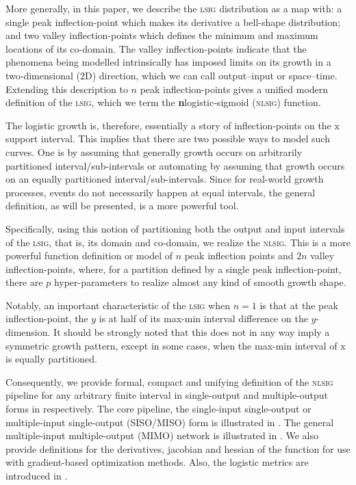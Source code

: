 \documentclass[journal]{IEEEtran}
\theoremstyle{plain}
\theoremstyle{definition}
\theoremstyle{remark}
\begin{document}
More generally, in this paper, we describe the \textsc{lsig} distribution as a map with: a single peak inflection-point which makes its derivative a bell-shape distribution; and two valley inflection-points which defines the minimum and maximum locations of its co-domain. The valley inflection-points indicate that the phenomena being modelled intrinsically has imposed limits
on its growth in a two-dimensional (2D) direction, which we can call output--input or space--time. Extending this description to $n$ peak inflection-points gives a unified modern definition of the \textsc{lsig}, which we term the \textbf{n}logistic-sigmoid (\textsc{nlsig}) function.

The logistic growth is, therefore, essentially a story of inflection-points on the $\mathrm{x}$ support interval. This implies that there are two possible ways to model such curves. One is by assuming that generally growth occurs on arbitrarily partitioned interval/sub-intervals or automating by assuming that growth occurs on an equally partitioned interval/sub-intervals. Since for real-world growth processes, events do not necessarily happen at equal intervals, the general definition, as will be presented, is a more powerful tool.

Specifically, using this notion of partitioning both the output and input intervals of the \textsc{lsig}, that is, its domain and co-domain, we realize the \textsc{nlsig}. This is a more powerful function definition or model of $n$ peak inflection points and $2n$ valley inflection-points, where, for a partition defined by a single peak inflection-point, there are $p$ hyper-parameters to realize almost any kind of smooth growth shape.

Notably, an important characteristic of the \textsc{lsig} when $n=1$ is that at the peak inflection-point, the $y$ is at half of its max-min interval difference on the $y$-dimension. It should be strongly noted that this does not in any way imply a symmetric growth pattern, except in some cases, when the max-min interval of $\mathrm{x}$ is equally partitioned.

Consequently, we provide formal, compact and unifying definition of the \textsc{nlsig} pipeline for any arbitrary finite interval in single-output and multiple-output forms in  respectively. The core pipeline, the single-input single-output or multiple-input single-output (SISO/MISO) form is illustrated in . The general multiple-input multiple-output (MIMO) network is illustrated in . We also provide definitions for the derivatives, jacobian and hessian of the function for use with gradient-based optimization methods. Also, the logistic metrics are introduced in .
\end{document}

